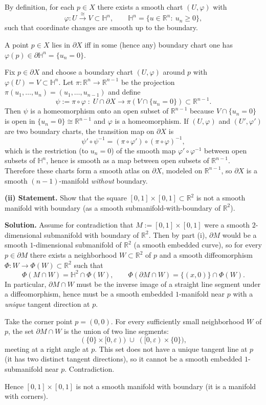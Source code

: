 \begin{solution}
By definition, for each $p\in X$ there exists a smooth chart $(U,\varphi)$ with
\[
\varphi:U\stackrel{\cong}{\longrightarrow} V\subset \mathbb{H}^n,
\qquad \mathbb{H}^n=\{u\in\mathbb{R}^n:\ u_n\ge 0\},
\]
such that coordinate changes are smooth up to the boundary.

A point $p\in X$ lies in $\partial X$ iff in some (hence any) boundary chart one has
$\varphi(p)\in \partial\mathbb{H}^n=\{u_n=0\}$.

Fix $p\in \partial X$ and choose a boundary chart $(U,\varphi)$ around $p$ with
$\varphi(U)=V\subset \mathbb{H}^n$. Let $\pi:\mathbb{R}^n\to\mathbb{R}^{n-1}$ be the projection
$\pi(u_1,\dots,u_n)=(u_1,\dots,u_{n-1})$ and define
\[
\psi := \pi\circ \varphi \;:\; U\cap \partial X \longrightarrow \pi(V\cap \{u_n=0\}) \subset \mathbb{R}^{n-1}.
\]
Then $\psi$ is a homeomorphism onto an open subset of $\mathbb{R}^{n-1}$ because
$V\cap\{u_n=0\}$ is open in $\{u_n=0\}\cong \mathbb{R}^{n-1}$ and $\varphi$ is a homeomorphism.
If $(U,\varphi)$ and $(U',\varphi')$ are two boundary charts, the transition map on $\partial X$ is
\[
\psi'\circ \psi^{-1}
= (\pi\circ \varphi')\circ (\pi\circ \varphi)^{-1},
\]
which is the restriction (to $u_n=0$) of the smooth map $\varphi'\circ \varphi^{-1}$ between open subsets of
$\mathbb{H}^n$, hence is smooth as a map between open subsets of $\mathbb{R}^{n-1}$.
Therefore these charts form a smooth atlas on $\partial X$, modeled on $\mathbb{R}^{n-1}$,
so $\partial X$ is a smooth $(n-1)$-manifold \emph{without} boundary.

\bigskip
\textbf{(ii) Statement.} Show that the square $[0,1]\times[0,1]\subset \mathbb{R}^2$ is not a smooth manifold with boundary
(as a smooth submanifold-with-boundary of $\mathbb{R}^2$).

\medskip
\noindent\textbf{Solution.}
Assume for contradiction that $M:=[0,1]\times[0,1]$ were a smooth $2$-dimensional submanifold with boundary of $\mathbb{R}^2$.
Then by part (i), $\partial M$ would be a smooth $1$-dimensional submanifold of $\mathbb{R}^2$ (a smooth embedded curve),
so for every $p\in \partial M$ there exists a neighborhood $W\subset \mathbb{R}^2$ of $p$ and a smooth diffeomorphism
$\Phi:W\to \Phi(W)\subset \mathbb{R}^2$ such that
\[
\Phi(M\cap W) = \mathbb{H}^2\cap \Phi(W), \qquad
\Phi(\partial M\cap W)=\{(x,0)\}\cap \Phi(W).
\]
In particular, $\partial M\cap W$ must be the inverse image of a straight line segment under a diffeomorphism,
hence must be a smooth embedded $1$-manifold near $p$ with a \emph{unique} tangent direction at $p$.

Take the corner point $p=(0,0)$. For every sufficiently small neighborhood $W$ of $p$,
the set $\partial M\cap W$ is the union of two line segments:
\[
(\{0\}\times[0,\varepsilon)) \;\cup\; ([0,\varepsilon)\times\{0\}),
\]
meeting at a right angle at $p$. This set does not have a unique tangent line at $p$ (it has two distinct tangent directions),
so it cannot be a smooth embedded $1$-submanifold near $p$. Contradiction.

Hence $[0,1]\times[0,1]$ is not a smooth manifold with boundary (it is a manifold with corners).
\end{solution}

